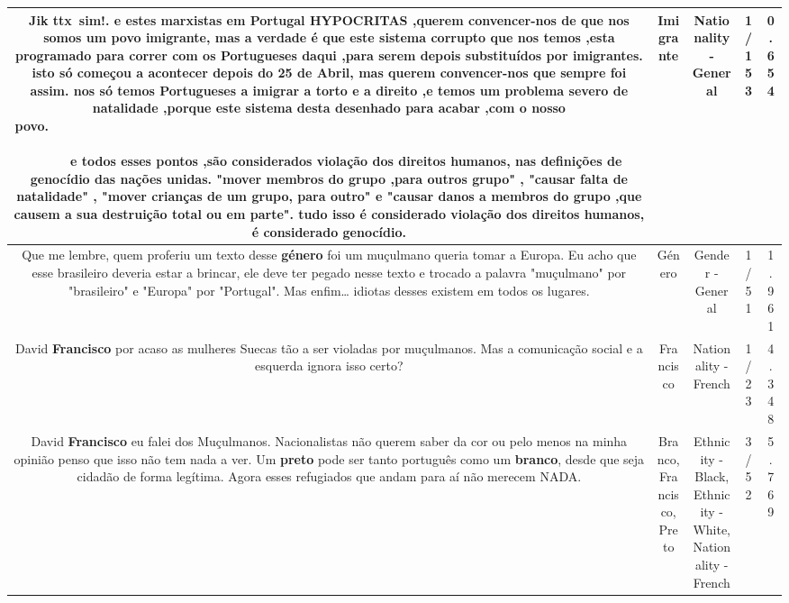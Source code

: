 \documentclass[11pt]{article}
\newlength\mylength
\begin{document}
\begin{center}
\begin{longtable}{|C{.65\mylength}|C{.30\mylength}|C{.12\mylength}|C{.12\mylength}|C{.12\mylength}|}
  \small Jik ttx sim!. e estes marxistas em Portugal HYPOCRITAS ,querem convencer-nos de que nos somos um povo \textbf{imigrante}, mas a verdade é que este sistema corrupto que nos temos ,esta programado para correr com os Portugueses daqui ,para serem depois substituídos por imigrantes. isto só começou a acontecer depois do 25 de Abril, mas querem convencer-nos que sempre foi assim. nos só temos Portugueses a imigrar a torto e a direito ,e temos um problema severo de natalidade ,porque este sistema desta desenhado para acabar ,com o nosso povo.                                                                                                                                                                              e todos esses pontos ,são considerados violação dos direitos humanos, nas definições de genocídio das nações unidas. "mover membros do grupo ,para outros grupo" , "causar falta de natalidade" , "mover crianças de um grupo, para outro" e "causar danos a membros do grupo ,que causem a sua destruição total ou em parte". tudo isso é considerado violação dos direitos humanos, é considerado genocídio.\normalsize   & Imigrante & Nationality - General & 1/153 & 0.654 \\  \hline
  \small Que me lembre, quem proferiu um texto desse \textbf{género} foi um muçulmano queria tomar a Europa. Eu acho que esse brasileiro deveria estar a brincar, ele deve ter pegado nesse texto e trocado a palavra "muçulmano" por "brasileiro" e "Europa" por "Portugal". Mas enfim… idiotas desses existem em todos os lugares.\normalsize   & Género & Gender - General & 1/51 & 1.961 \\  \hline
  \small David \textbf{Francisco} por acaso as mulheres Suecas tão a ser violadas por muçulmanos. Mas a comunicação social e a esquerda ignora isso certo?\normalsize   & Francisco & Nationality - French & 1/23 & 4.348 \\  \hline
  \small David \textbf{Francisco} eu falei dos Muçulmanos. Nacionalistas não querem saber da cor ou pelo menos na minha opinião penso que isso não tem nada a ver. Um \textbf{preto} pode ser tanto português como um \textbf{branco}, desde que seja cidadão de forma legítima. Agora esses refugiados que andam para aí não merecem NADA.\normalsize   & Branco, Francisco, Preto & Ethnicity - Black, Ethnicity - White, Nationality - French & 3/52 & 5.769 \\  \hline

\end{longtable}
\end{center}
\end{document}

